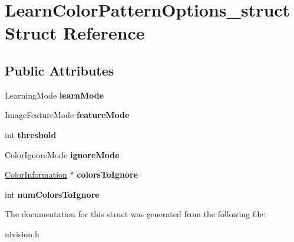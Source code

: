 \hypertarget{structLearnColorPatternOptions__struct}{\section{\-Learn\-Color\-Pattern\-Options\-\_\-struct \-Struct \-Reference}
\label{structLearnColorPatternOptions__struct}
}
\subsection*{\-Public \-Attributes}
\begin{DoxyCompactItemize}
\item 
\hypertarget{structLearnColorPatternOptions__struct_ad0c016ef0cc486c5bac39d274aea33b1}{\-Learning\-Mode {\bfseries learn\-Mode}}\label{structLearnColorPatternOptions__struct_ad0c016ef0cc486c5bac39d274aea33b1}

\item 
\hypertarget{structLearnColorPatternOptions__struct_aca40d70840573519413c5963529535f7}{\-Image\-Feature\-Mode {\bfseries feature\-Mode}}\label{structLearnColorPatternOptions__struct_aca40d70840573519413c5963529535f7}

\item 
\hypertarget{structLearnColorPatternOptions__struct_a18b4f4e1c391f98ab937effa141f631e}{int {\bfseries threshold}}\label{structLearnColorPatternOptions__struct_a18b4f4e1c391f98ab937effa141f631e}

\item 
\hypertarget{structLearnColorPatternOptions__struct_ae8b22445bf75cc0275d4a0aec85af6d4}{\-Color\-Ignore\-Mode {\bfseries ignore\-Mode}}\label{structLearnColorPatternOptions__struct_ae8b22445bf75cc0275d4a0aec85af6d4}

\item 
\hypertarget{structLearnColorPatternOptions__struct_ab1df6e206279b2c3be1c80eb86e0e92b}{\hyperlink{structColorInformation__struct}{\-Color\-Information} $\ast$ {\bfseries colors\-To\-Ignore}}\label{structLearnColorPatternOptions__struct_ab1df6e206279b2c3be1c80eb86e0e92b}

\item 
\hypertarget{structLearnColorPatternOptions__struct_ad95d28e72bf3bfef281b2c3a4cd70827}{int {\bfseries num\-Colors\-To\-Ignore}}\label{structLearnColorPatternOptions__struct_ad95d28e72bf3bfef281b2c3a4cd70827}

\end{DoxyCompactItemize}


\-The documentation for this struct was generated from the following file\-:\begin{DoxyCompactItemize}
\item 
nivision.\-h\end{DoxyCompactItemize}
